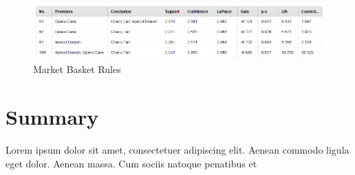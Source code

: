 \begin{figure}[H]
	\centering
	\includegraphics[width=\maxwidth{.95\linewidth}]{gfx/06-MarketBasketRules}
	\caption{Market Basket Rules}
	\label{fig06.07}
\end{figure}


\section{Summary}\label{ch06:summary}

Lorem ipsum dolor sit amet, consectetuer adipiscing elit. Aenean commodo ligula eget dolor. Aenean massa. Cum sociis natoque penatibus et
